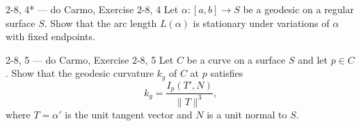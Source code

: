 \begin{exercise}{2-8, 4* — do Carmo, Exercise 2-8, 4}
Let $\alpha: [a,b] \to S$ be a geodesic on a regular surface $S$. Show that the arc length $L(\alpha)$ is stationary under variations of $\alpha$ with fixed endpoints.
\end{exercise}

\begin{exercise}{2-8, 5 — do Carmo, Exercise 2-8, 5}
Let $C$ be a curve on a surface $S$ and let $p \in C$. Show that the geodesic curvature $k_g$ of $C$ at $p$ satisfies
\[
k_g = \frac{I_p(T', N)}{\|T\|^3},
\]
where $T = \alpha'$ is the unit tangent vector and $N$ is a unit normal to $S$.
\end{exercise}
